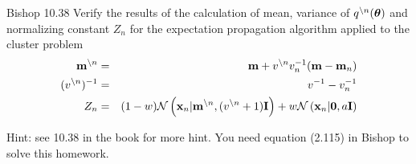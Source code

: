 \documentclass{amsmlaj}
\begin{document}
\begin{problem}\textsf{Bishop 10.38}
Verify the results of the calculation of mean, variance of $q^{\backslash n}(\bm{\mathbf{\theta}})$ and normalizing constant $Z_n$ for the expectation propagation algorithm applied to the cluster problem
\begin{eqnarray}
\bm{\mathbf{m}}^{\backslash n} & = & \bm{\mathbf{m}} + v^{\backslash n}v_n^{-1}(\bm{\mathbf{m}}-\bm{\mathbf{m}}_n)\\
(v^{\backslash n})^{-1} & = & v^{-1} - v_n^{-1}\\
Z_n & = & (1-w)\mathcal{N}\left(\bm{\mathbf{x}}_n|\bm{\mathbf{m}}^{\backslash n}, (v^{\backslash n}+1)\bm{\mathbf{I}}\right) + w\mathcal{N}\left(\bm{\mathbf{x}}_n|\bm{\mathbf{0}},a\bm{\mathbf{I}}\right)
\end{eqnarray}

Hint: see 10.38 in the book for more hint. You need equation (2.115) in Bishop to solve this homework.
\end{problem}
\end{document}
